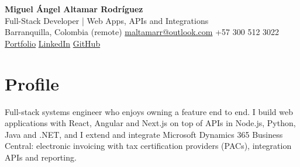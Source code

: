 \documentclass[10pt]{article}
\begin{document}
\begin{center}
  {\LARGE\bfseries Miguel Ángel Altamar Rodríguez}\\[0.3em]
  {\large Full-Stack Developer | Web Apps, APIs and Integrations}\\[0.4em]
  Barranquilla, Colombia (remote) \enspace\textbullet\enspace
  \href{mailto:maltamarr@outlook.com}{maltamarr@outlook.com} \enspace\textbullet\enspace
  +57 300 512 3022\\[0.15em]
  \href{https://migueiangel.github.io/portfolio/}{Portfolio} \enspace\textbullet\enspace
  \href{https://www.linkedin.com/in/mangel2002/}{LinkedIn} \enspace\textbullet\enspace
  \href{https://github.com/MigueIAngel}{GitHub}
\end{center}
\vspace{0.1em}

\section*{Profile}
Full-stack systems engineer who enjoys owning a feature end to end. I build web applications with React, Angular and Next.js on top of APIs in Node.js, Python, Java and .NET, and I extend and integrate Microsoft Dynamics 365 Business Central: electronic invoicing with tax certification providers (PACs), integration APIs and reporting.
\end{document}
